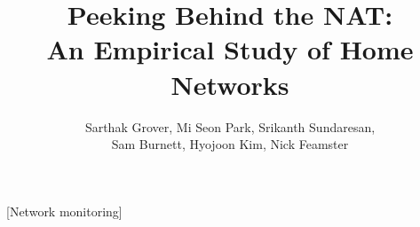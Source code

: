 \documentclass{sig-alternate-2013}
\begin{document}
\title{Peeking Behind the NAT: \\ An Empirical Study of Home Networks}
\author{Sarthak Grover, Mi Seon Park, Srikanth Sundaresan, \\ Sam Burnett,
  Hyojoon Kim, Nick Feamster \\ 
}
\maketitle

%



\begin{sloppypar}


[Network monitoring]










\end{sloppypar}

\begin{small}

\balance
\label{lastpage}
\end{small}
\end{document}
